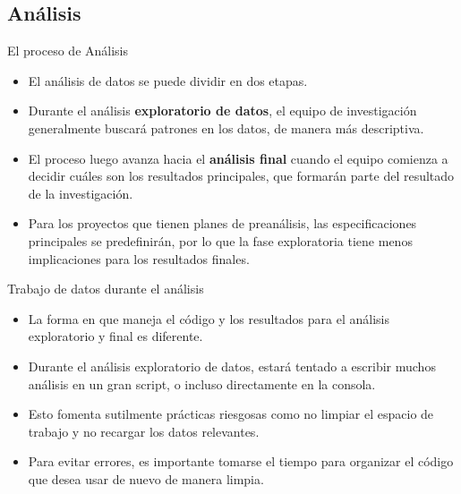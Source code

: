 \documentclass[10pt, aspectratio=169, compress]{beamer}
\begin{document}
\subsection{Análisis}
\begin{frame}[t]{El proceso de Análisis}
	\begin{itemize}[<+->]
		\item El análisis de datos se puede dividir en dos etapas.
		\item Durante el análisis \textbf{exploratorio de datos}, el equipo de investigación generalmente buscará patrones en los datos, de manera más descriptiva.
		\item El proceso luego avanza hacia el \textbf{análisis final} cuando el equipo comienza a decidir cuáles son los resultados principales, que formarán parte del resultado de la investigación.
		\item Para los proyectos que tienen planes de preanálisis, las especificaciones principales se predefinirán, por lo que la fase exploratoria tiene menos implicaciones para los resultados finales.
	\end{itemize}
\end{frame}
\begin{frame}[t]{Trabajo de datos durante el análisis}
	\begin{itemize}[<+->]
		\item La forma en que maneja el código y los resultados para el análisis exploratorio y final es diferente.
		\item Durante el análisis exploratorio de datos, estará tentado a escribir muchos análisis en un gran script, o incluso directamente en la consola.
		\item Esto fomenta sutilmente prácticas riesgosas como no limpiar el espacio de trabajo y no recargar los datos relevantes.
		\item Para evitar errores, es importante tomarse el tiempo para organizar el código que desea usar de nuevo de manera limpia.
	\end{itemize}
\end{frame}
\end{document}
